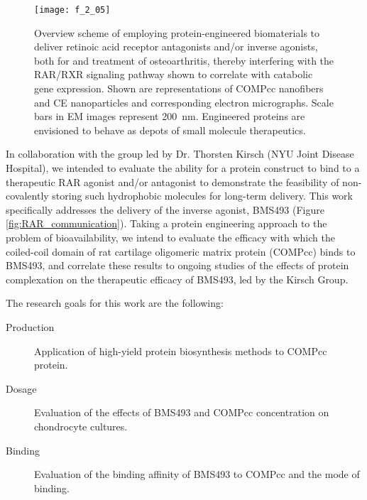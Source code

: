 \begin{refsection}
\begin{figure}[h!] \centering \texttt{[image: f\_2\_05]}
    \caption{Overview scheme of employing protein-engineered biomaterials to
        deliver retinoic acid receptor antagonists and/or inverse agonists, both
        for  and  treatment of osteoarthritis,
        thereby interfering with the RAR/RXR signaling pathway shown to
        correlate with catabolic gene expression.  Shown are representations of
        COMPcc nanofibers and CE nanoparticles and corresponding electron
        micrographs. Scale bars in EM images represent \SI{200}{\nm}. Engineered
        proteins are envisioned to behave as depots of small molecule
    therapeutics.}\label{fig:research_intention} \end{figure}
In collaboration with the group led by Dr. Thorsten Kirsch (NYU Joint Disease
Hospital), we intended to evaluate the ability for a protein construct to bind
to a therapeutic RAR agonist and/or antagonist to demonstrate the feasibility of
non-covalently storing such hydrophobic molecules for long-term delivery. This
work specifically addresses the delivery of the inverse agonist, BMS493 (Figure
\ref{fig:RAR_communication}). Taking a protein engineering approach to the
problem of bioavailability, we intend to evaluate the efficacy with which the
coiled-coil domain of rat cartilage oligomeric matrix protein (COMPcc) binds to
BMS493, and correlate these results to ongoing  studies of the
effects of protein complexation on the therapeutic efficacy of BMS493, led by
the Kirsch Group. 

The research goals for this work are the following:
\begin{description}
    \item[Production] Application of high-yield protein biosynthesis methods to
        COMPcc protein.
    \item[Dosage] Evaluation of the effects of BMS493 and COMPcc concentration on
         chondrocyte cultures.
    \item[Binding] Evaluation of the binding affinity of BMS493 to COMPcc and
        the mode of binding.
\end{description}


\end{refsection}
